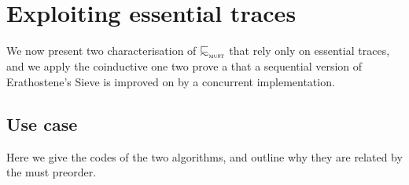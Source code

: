\section{Exploiting essential traces}
We now present two characterisation of $\testleqS$ that rely only on essential traces,
and we apply the coinductive one two prove a that a sequential version of Erathostene's Sieve
is improved on by a concurrent implementation.


\subsection{Use case}
Here we give the codes of the two algorithms,
and outline why they are related by the must preorder.
